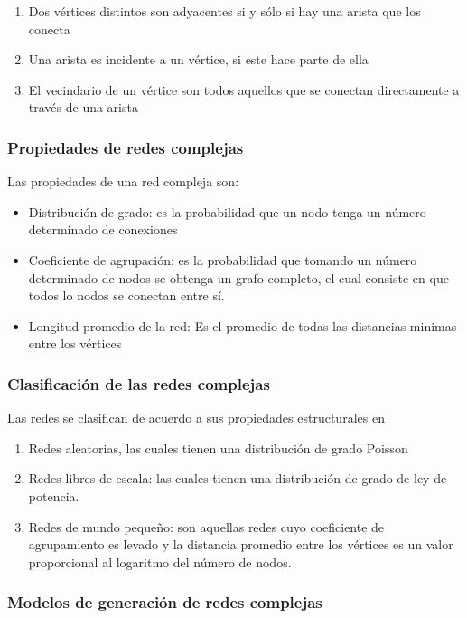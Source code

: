 \begin{enumerate}
    \item Dos vértices distintos son adyacentes si y sólo si hay una arista que los conecta
    \item Una arista es incidente a un vértice, si este hace parte de ella
    \item El vecindario de un vértice son todos aquellos que se conectan directamente a través de una arista
\end{enumerate}

\subsubsection{Propiedades de redes complejas}

Las propiedades de una red compleja son\cite{barabasi2002linked}:

\begin{itemize}
    \item Distribución de grado: es la probabilidad que un nodo tenga un número determinado de conexiones
    \item Coeficiente de agrupación: es la probabilidad que tomando un número determinado de nodos se obtenga un grafo completo, el cual consiste en que todos lo nodos se conectan entre sí.
    \item Longitud promedio de la red: Es el promedio de todas las distancias minimas entre los vértices
\end{itemize}

\subsubsection{Clasificación de las redes complejas}

Las redes se clasifican de acuerdo a sus propiedades estructurales en

\begin{enumerate}
    \item Redes aleatorias, las cuales tienen una distribución de grado Poisson
    \item Redes libres de escala: las cuales tienen una distribución de grado de ley de potencia.
    \item Redes de mundo pequeño: son aquellas redes cuyo coeficiente de agrupamiento es levado y la distancia promedio entre los vértices es un valor proporcional al logaritmo del número de nodos.
\end{enumerate}

\subsubsection{Modelos de generación de redes complejas}

